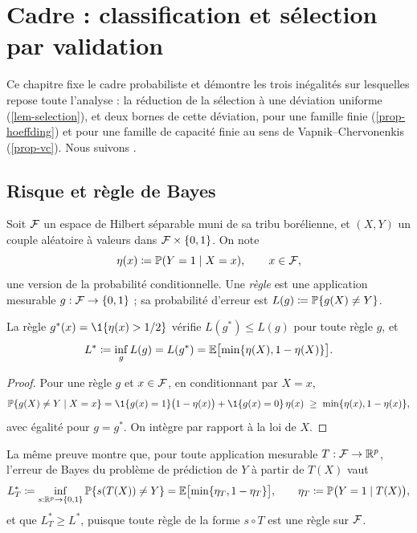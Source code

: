 \chapter{Cadre : classification et sélection par validation}\label{chap-cadre}

Ce chapitre fixe le cadre probabiliste et démontre les trois inégalités sur lesquelles repose toute l'analyse : la réduction de la sélection à une déviation uniforme (\cref{lem-selection}), et deux bornes de cette déviation, pour une famille finie (\cref{prop-hoeffding}) et pour une famille de capacité finie au sens de Vapnik--Chervonenkis (\cref{prop-vc}). Nous suivons \citet[chapitres 2, 8, 12 et 13]{devroye1996probabilistic}.

\section{Risque et règle de Bayes}

Soit $\mathcal{F}$ un espace de Hilbert séparable muni de sa tribu borélienne, et $(X,Y)$ un couple aléatoire à valeurs dans $\mathcal{F}\times\{0,1\}$. On note
\[
  \eta(x) \coloneqq \mathbb{P}(Y=1\mid X=x), \qquad x\in\mathcal{F},
\]
une version de la probabilité conditionnelle. Une \emph{règle} est une application mesurable $g:\mathcal{F}\to\{0,1\}$ ; sa probabilité d'erreur est $L(g)\coloneqq\mathbb{P}\{g(X)\neq Y\}$.

\begin{proposition}\label{prop-bayes}
La règle $g^*(x)=\1\{\eta(x)>1/2\}$ vérifie $L(g^*)\le L(g)$ pour toute règle $g$, et
\[
  L^* \coloneqq \inf_{g} L(g) = L(g^*) = \mathbb{E}\bigl[\min\{\eta(X),1-\eta(X)\}\bigr].
\]
\end{proposition}

\begin{proof}
Pour une règle $g$ et $x\in\mathcal{F}$, en conditionnant par $X=x$,
\[
  \PP\{g(X)\neq Y\mid X=x\} = \1\{g(x)=1\}\bigl(1-\eta(x)\bigr) + \1\{g(x)=0\}\,\eta(x) \;\ge\; \min\{\eta(x),1-\eta(x)\},
\]
avec égalité pour $g=g^*$. On intègre par rapport à la loi de $X$.
\end{proof}

La même preuve montre que, pour toute application mesurable $T:\mathcal{F}\to\mathbb{R}^p$, l'erreur de Bayes du problème de prédiction de $Y$ à partir de $T(X)$ vaut
\begin{equation}\label{eq-bayes-T}
  L^*_{T} \coloneqq \inf_{s:\mathbb{R}^p\to\{0,1\}}\mathbb{P}\{s(T(X))\neq Y\} = \mathbb{E}\bigl[\min\{\eta_T,1-\eta_T\}\bigr],
  \qquad \eta_T\coloneqq\mathbb{P}\bigl(Y=1\mid T(X)\bigr),
\end{equation}
et que $L^*_T\ge L^*$, puisque toute règle de la forme $s\circ T$ est une règle sur $\mathcal{F}$.


